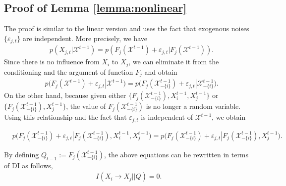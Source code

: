 \subsection{Proof of Lemma \ref{lemma:nonlinear}}
The proof is similar to the linear version and uses the fact that exogenous noises $\{\varepsilon_{j,t}\}$ are independent. More precisely, we have  
\begin{align*}
    &p(X_{j,t}|\mathcal{X}^{t-1})=p(F_{j}(\mathcal{X}^{t-1}) + \varepsilon_{j,t}|F_{j}(\mathcal{X}^{t-1})).
\end{align*}
Since there is no influence from $X_i$ to $X_j$, we can eliminate it from the conditioning and the argument of function $F_j$ and obtain
\begin{align*}
&p\big(F_{j}(\mathcal{X}^{t-1}) + \varepsilon_{j,t}|\mathcal{X}^{t-1}\big)=p\big(F_{j}(\mathcal{X}_{-\{i\}}^{t-1}) + \varepsilon_{j,t}|\mathcal{X}_{-\{i\}}^{t-1}\big).
\end{align*}
On the other hand, because given either $\{F_{j}(\mathcal{X}_{-\{i\}}^{t-1}), X_i^{t-1},X_j^{t-1}\}$ or \\
$\{F_{j}(\mathcal{X}_{-\{i\}}^{t-1}),X_j^{t-1}\}$, the value of $F_{j}(\mathcal{X}_{-\{i\}}^{t-1})$ is no longer a random variable. Using this relationship and the fact that $\varepsilon_{j,t}$ is independent of $\mathcal{X}^{t-1}$, we obtain
\begin{small}
\begin{align*}
    &p\big(F_{j}(\mathcal{X}_{-\{i\}}^{t-1}) + \varepsilon_{j,t}|F_{j}(\mathcal{X}_{-\{i\}}^{t-1}), X_i^{t-1},X_j^{t-1}\big)=
    p\big(F_{j}(\mathcal{X}_{-\{i\}}^{t-1}) + \varepsilon_{j,t}|F_{j}(\mathcal{X}_{-\{i\}}^{t-1}), X_j^{t-1}\big).
\end{align*}
\end{small}
By defining $Q_{t-1}:=F_{j}(\mathcal{X}_{-\{i\}}^{t-1})$, the above equations can be rewritten in terms of DI as follows,
\begin{align*}
    I(X_i\rightarrow X_j||Q)=0.
\end{align*}

